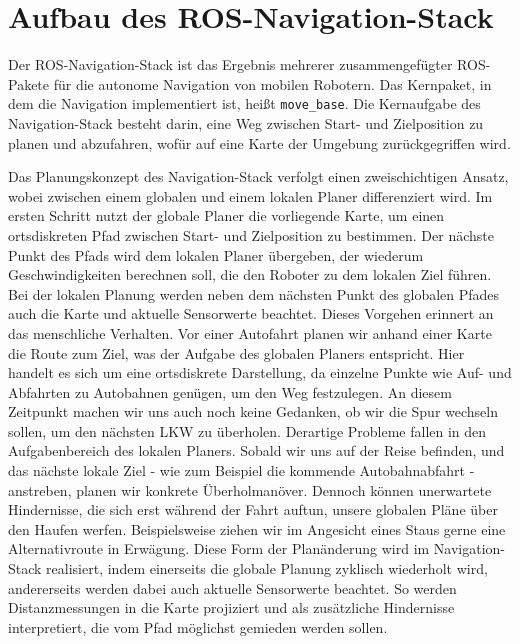 \section*{Aufbau des ROS-Navigation-Stack}
Der ROS-Navigation-Stack ist das Ergebnis mehrerer zusammengefügter ROS-Pakete für die autonome Navigation von mobilen Robotern. Das Kernpaket, in dem die Navigation implementiert ist, heißt \lstinline{move_base}{}. Die Kernaufgabe des Navigation-Stack besteht darin, eine Weg zwischen Start- und Zielposition zu planen und abzufahren, wofür auf eine Karte der Umgebung zurückgegriffen wird.

Das Planungskonzept des Navigation-Stack verfolgt einen zweischichtigen Ansatz, wobei zwischen einem globalen und einem lokalen Planer differenziert wird. Im ersten Schritt nutzt der globale Planer die vorliegende Karte, um einen ortsdiskreten Pfad zwischen Start- und Zielposition zu bestimmen. Der nächste Punkt des Pfads wird dem lokalen Planer übergeben, der wiederum Geschwindigkeiten berechnen soll, die den Roboter zu dem lokalen Ziel führen. Bei der lokalen Planung werden neben dem nächsten Punkt des globalen Pfades auch die Karte und aktuelle Sensorwerte beachtet. Dieses Vorgehen erinnert an das menschliche Verhalten. Vor einer Autofahrt planen wir anhand einer Karte die Route zum Ziel, was der Aufgabe des globalen Planers entspricht. Hier handelt es sich um eine ortsdiskrete Darstellung, da einzelne Punkte wie Auf- und Abfahrten zu Autobahnen genügen, um den Weg festzulegen. An diesem Zeitpunkt machen wir uns auch noch keine Gedanken, ob wir die Spur wechseln sollen, um den nächsten LKW zu überholen. Derartige Probleme fallen in den Aufgabenbereich des lokalen Planers. Sobald wir uns auf der Reise befinden, und das nächste lokale Ziel - wie zum Beispiel die kommende Autobahnabfahrt - anstreben, planen wir konkrete Überholmanöver. Dennoch können unerwartete Hindernisse, die sich erst während der Fahrt auftun, unsere globalen Pläne über den Haufen werfen. Beispielsweise ziehen wir im Angesicht eines Staus gerne eine Alternativroute in Erwägung. Diese Form der Planänderung wird im Navigation-Stack realisiert, indem einerseits die globale Planung zyklisch wiederholt wird, andererseits werden dabei auch aktuelle Sensorwerte beachtet. So werden Distanzmessungen in die Karte projiziert und als zusätzliche Hindernisse interpretiert, die vom Pfad möglichst gemieden werden sollen.

